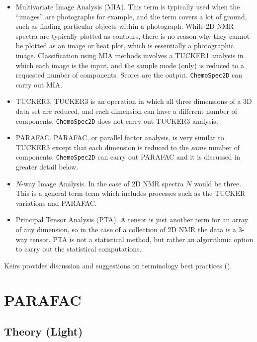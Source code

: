 \documentclass[letter,10pt,twocolumn,twoside,printwatermark=false]{pinp}
\providecommand{\tightlist}{%
  \setlength{\itemsep}{0pt}\setlength{\parskip}{0pt}}
\begin{document}
\begin{itemize}
\tightlist
\item
  Multivariate Image Analysis (MIA). This term is typically used when
  the ``images'' are photographs for example, and the term covers a lot
  of ground, such as finding particular objects within a photograph.
  While 2D NMR spectra are typically plotted as contours, there is no
  reason why they cannot be plotted as an image or heat plot, which is
  essentially a photographic image. Classification using MIA methods
  involves a TUCKER1 analysis in which each image is the input, and the
  sample mode (only) is reduced to a requested number of components.
  Scores are the output. \texttt{ChemoSpec2D} can carry out MIA.
\item
  TUCKER3. TUCKER3 is an operation in which all three dimensions of a 3D
  data set are reduced, and each dimension can have a different number
  of components. \texttt{ChemoSpec2D} does not carry out TUCKER3
  analysis.
\item
  PARAFAC. PARAFAC, or parallel factor analysis, is very similar to
  TUCKER3 except that each dimension is reduced to the \emph{same}
  number of components. \texttt{ChemoSpec2D} can carry out PARAFAC and
  it is discussed in greater detail below.
\item
  \(N\)-way Image Analysis. In the case of 2D NMR spectra \(N\) would be
  three. This is a general term term which includes processes such as
  the TUCKER variations and PARAFAC.
\item
  Principal Tensor Analysis (PTA). A tensor is just another term for an
  array of any dimension, so in the case of a collection of 2D NMR the
  data is a 3-way tensor. PTA is not a statistical method, but rather an
  algorithmic option to carry out the statistical computations.
\end{itemize}

Keirs provides discussion and suggestions on terminology best practices
(\cite{Kiers2000}).

\hypertarget{parafac}{%
\section{PARAFAC}\label{parafac}}

\hypertarget{theory-light}{%
\subsection{Theory (Light)}\label{theory-light}}
\end{document}
